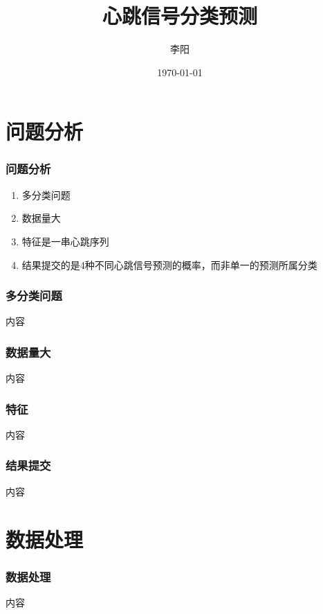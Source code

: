 \documentclass[aspectratio=43, 12pt, utf8, mathserif]{ctexbeamer} %
\begin{document}
\title{\bf 心跳信号分类预测}
\author{李阳}
\date{\today}

\begin{frame}
    \titlepage    
\end{frame}


\section{问题分析}
\begin{frame}
    \frametitle{问题分析}
    \begin{enumerate}
        \item 多分类问题
        \item 数据量大
        \item 特征是一串心跳序列
        \item 结果提交的是4种不同心跳信号预测的概率，而非单一的预测所属分类
    \end{enumerate}
\end{frame}

\begin{frame}
    \frametitle{多分类问题}
    内容
\end{frame}

\begin{frame}
    \frametitle{数据量大}
    内容
\end{frame}

\begin{frame}
    \frametitle{特征}
    内容
\end{frame}

\begin{frame}
    \frametitle{结果提交}
    内容
\end{frame}

\section{数据处理}
\begin{frame}
    \frametitle{数据处理}
    内容
\end{frame}
\end{document}
